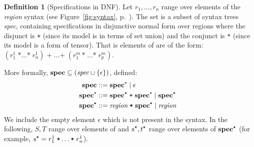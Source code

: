 \documentclass[9pt,preprint]{sigplanconf}
\newcounter{block}
\theoremstyle{definition}
\newtheorem{definition}[block]{Definition}
\newcommand{\term}[1]{\texttt{#1}}
\begin{document}
\begin{definition}[Specifications in DNF]
Let $r_1, ..., r_n$ range over elements of the \textit{region}
syntax (see Figure~\ref{fig:syntax}, p.~\pageref{fig:syntax}).
The set \specDNF{} is a subset of syntax trees \textit{spec},
containing specifications in disjunctive normal form over regions 
where the disjunct is \term{+} (since its model is in terms of set
union) and the conjunct is \term{*} (since its model is a form of tensor).
That is elements of \specDNF{} are of the form:
$
(r^1_{1} \; \term{*} \ldots \term{*} \; r^1_n)\; \term{+} \; \ldots 
\term{+} \; (r^m_1 \, \term{*} \; \ldots \term{*} \; r^m_p)
$. 

More formally, $\textbf{spec} \subseteq (\textit{spec} \cup \{\epsilon\})$, defined:
\begin{align*}
\specDNF{} & ::= \tySum{\specDNF} \mid \epsilon \\
\tySum{\specDNF} & ::= \tyProd{\specDNF} \; \term{+} \; \tySum{\specDNF} \mid
  \tyProd{\specDNF} \\
\tyProd{\specDNF} & ::= \textit{region} \; \term{*} \; \tyProd{\specDNF} \mid
   \textit{region}
\end{align*}
We include the empty element $\epsilon$ which is not present in the
syntax. 
In the following, $S, T$ range over elements of
\specDNF{} and $\tyProd{s}, \tyProd{t}$ range over elements
of $\tyProd{\specDNF}$ (for example, $\tyProd{s} = r^1_{1} \; \term{*}
\ldots \term{*} \; r^1_n$).
\end{definition}

\newcommand{\exactR}{\mathsf{exact}\;}
\newcommand{\exact}[1]{\exactR(#1)}
\newcommand{\upperB}[1]{\mathsf{upper}\;(#1)}
\end{document}
